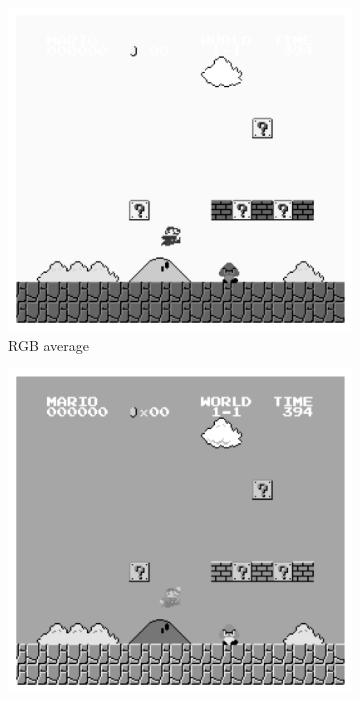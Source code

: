 \begin{figure}[ht]
    \begin{subfigure}{.16\textwidth}
        \centering
        \includegraphics*[width=\textwidth]{images/bw_comparison/avg.png}
        \caption*{RGB average}
    \end{subfigure}
    \hfill
    \begin{subfigure}{.16\textwidth}
        \centering
        \includegraphics*[width=\textwidth]{images/bw_comparison/ycc601.png}

\end{subfigure}
\end{figure}
